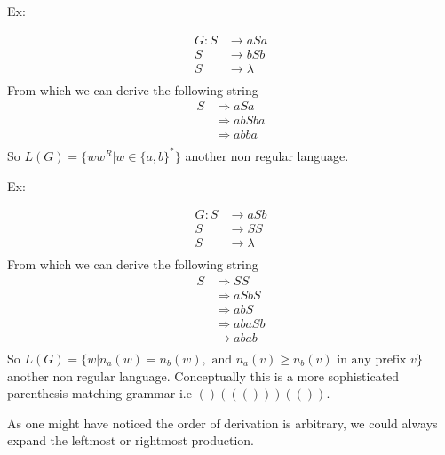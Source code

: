 \documentclass[11pt]{exam}
\begin{document}
Ex:
\begin{center}
\begin{align*}
G: S &\rightarrow aSa\\
   S &\rightarrow bSb\\
   S &\rightarrow \lambda\\
\end{align*}
From which we can derive the following string
\begin{align*}
S &\Rightarrow aSa\\
  &\Rightarrow abSba\\
  &\Rightarrow abba\\
\end{align*}
So $L(G) = \{ww^R | w \in \{a,b\}^* \}$ another non regular language.
\end{center}

Ex:
\begin{center}
\begin{align*}
G: S &\rightarrow aSb\\
   S &\rightarrow SS\\
   S &\rightarrow \lambda\\
\end{align*}
From which we can derive the following string
\begin{align*}
S &\Rightarrow SS\\
  &\Rightarrow aSbS\\
  &\Rightarrow abS\\
  &\Rightarrow abaSb\\
  &\rightarrow abab\\
\end{align*}
So $L(G) = \{w | n_a(w) = n_b(w), \text{ and } n_a(v) \geq n_b(v) \text{ in any prefix } v \}$ another non regular language. Conceptually this is a more sophisticated parenthesis matching grammar i.e $()((()))(())$.
\end{center}

As one might have noticed the order of derivation is arbitrary, we could always expand the leftmost or rightmost production.\\
\end{document}
